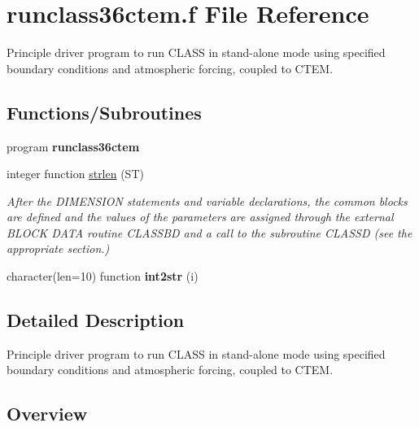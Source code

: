 \hypertarget{runclass36ctem_8f}{}\section{runclass36ctem.\+f File Reference}
\label{runclass36ctem_8f}


Principle driver program to run C\+L\+A\+S\+S in stand-\/alone mode using specified boundary conditions and atmospheric forcing, coupled to C\+T\+E\+M.  


\subsection*{Functions/\+Subroutines}
\begin{DoxyCompactItemize}
\item 
\hypertarget{runclass36ctem_8f_a6d56d6301df42923fa1e8aa2e6c02ec3}{}program {\bfseries runclass36ctem}\label{runclass36ctem_8f_a6d56d6301df42923fa1e8aa2e6c02ec3}

\item 
integer function \hyperlink{runclass36ctem_8f_ae665ea752226de365786f295628b2f4f}{strlen} (S\+T)
\begin{DoxyCompactList}\small\item\em After the D\+I\+M\+E\+N\+S\+I\+O\+N statements and variable declarations, the common blocks are defined and the values of the parameters are assigned through the external B\+L\+O\+C\+K D\+A\+T\+A routine C\+L\+A\+S\+S\+B\+D and a call to the subroutine C\+L\+A\+S\+S\+D (see the appropriate section.) \end{DoxyCompactList}\item 
\hypertarget{runclass36ctem_8f_a1804a475192bb994b7e4be078687d902}{}character(len=10) function {\bfseries int2str} (i)\label{runclass36ctem_8f_a1804a475192bb994b7e4be078687d902}

\end{DoxyCompactItemize}


\subsection{Detailed Description}
Principle driver program to run C\+L\+A\+S\+S in stand-\/alone mode using specified boundary conditions and atmospheric forcing, coupled to C\+T\+E\+M. 

\subsection*{Overview}

